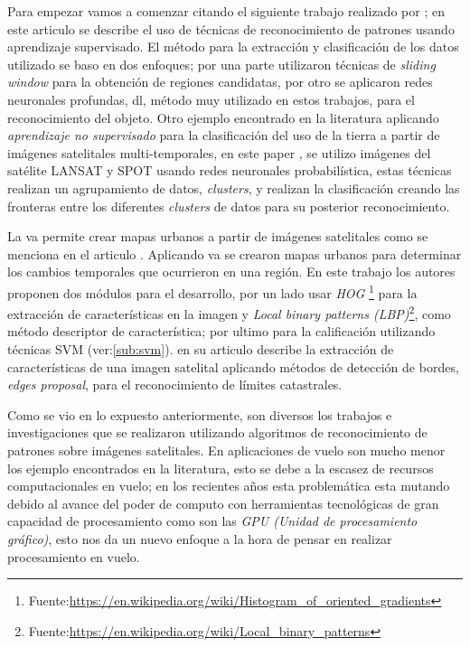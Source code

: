 Para empezar vamos a comenzar citando el siguiente trabajo realizado por \citep{Cheang}; en este articulo se describe el uso de técnicas de reconocimiento de patrones usando aprendizaje supervisado. El método para la extracción y clasificación de los datos utilizado se baso en dos enfoques; por una parte utilizaron técnicas de \textit{sliding window} para la obtención de regiones candidatas, por otro se aplicaron redes neuronales profundas, \ac{dl}, método muy utilizado en estos trabajos, para el reconocimiento del objeto. Otro ejemplo encontrado en la literatura aplicando  \textit{aprendizaje no supervisado} para la clasificación del uso de la tierra a partir de imágenes satelitales multi-temporales, en este paper \citep{pnn}, se utilizo imágenes del satélite LANSAT y SPOT usando redes neuronales probabilística, estas técnicas realizan un agrupamiento de datos, \textit{clusters}, y realizan la clasificación creando las fronteras entre los diferentes \textit{clusters} de datos para su posterior reconocimiento.

La \ac{va} permite crear mapas urbanos a partir de imágenes satelitales como se menciona en el articulo \citep{detectionHOG}. Aplicando \ac{va} se crearon mapas urbanos para determinar los cambios temporales que ocurrieron en una región. En este trabajo los autores proponen dos módulos para el desarrollo, por un lado usar \textit{HOG} \footnote{Fuente:\url{https://en.wikipedia.org/wiki/Histogram_of_oriented_gradients}} para la extracción de características en la imagen y \textit{Local binary patterns (LBP)}\footnote{Fuente:\url{https://en.wikipedia.org/wiki/Local_binary_patterns}}, como método descriptor de característica; por ultimo para la calificación utilizando técnicas SVM (ver:\ref{sub:svm}). \cite{usman} en su articulo describe la extracción de características de una imagen satelital aplicando métodos de  detección de bordes, \textit{edges proposal}, para el 
reconocimiento de límites catastrales.

Como se vio en lo expuesto anteriormente, son diversos los trabajos e investigaciones que se realizaron utilizando algoritmos de reconocimiento de patrones sobre imágenes satelitales. En aplicaciones de vuelo son mucho menor los ejemplo encontrados en la literatura, esto se debe a la escasez de recursos computacionales en vuelo; en los recientes años esta problemática esta mutando debido al avance del poder de computo con herramientas tecnológicas de gran capacidad de procesamiento como son las \textit{GPU (Unidad de procesamiento gráfico)}, esto nos da un nuevo enfoque a la hora de pensar en realizar procesamiento en vuelo.

